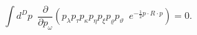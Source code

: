 \begin{equation}\label{dp7}
    \int d^Dp\,\,\,
        \frac{\partial}{\partial p_{\omega}}
    \left(
        p_{\lambda}p_{\tau}p_{\kappa}p_{\eta}p_{\xi}p_{\varrho}p_{\vartheta}\,\,\,
        e^{-\frac{1}{2}p\cdot R\cdot p}
    \right)
    =0.
\end{equation}

